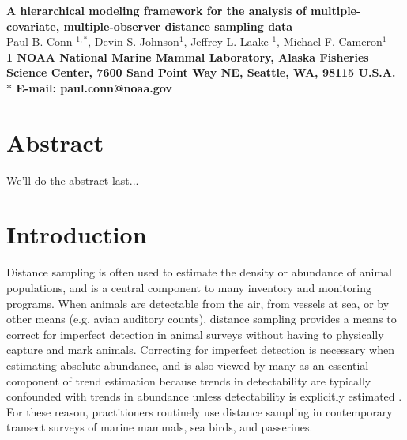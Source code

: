 \documentclass[10pt]{article}
\date{}
\begin{document}
\begin{flushleft}
{\Large
\textbf{A hierarchical modeling framework for the analysis of
multiple-covariate, multiple-observer distance sampling data} }
\\
Paul B. Conn $^{1,\ast}$,
Devin S. Johnson$^{1}$,
Jeffrey L. Laake $^{1}$,
Michael F. Cameron$^{1}$
\\
\bf{1} NOAA National Marine Mammal Laboratory, Alaska Fisheries Science Center,
7600 Sand Point Way NE, Seattle, WA, 98115 U.S.A.
\\
$\ast$ E-mail: paul.conn@noaa.gov
\end{flushleft}

\section*{Abstract}
We'll do the abstract last...


\section*{Introduction}

Distance sampling \cite{BucklandEtAl2001} is often used to estimate the density or abundance of animal populations, and is a central component to many inventory and monitoring programs.  When animals are detectable from the air, from vessels at sea, or by other means (e.g. avian auditory counts), distance sampling provides a means to correct for imperfect detection in animal surveys without having to physically capture and mark animals.  Correcting for imperfect detection is necessary when estimating absolute abundance, and is also viewed by many as an essential component of trend estimation because trends in detectability are typically confounded with trends in abundance unless detectability is explicitly estimated \cite{Buckland2006,NicholsEtAl2009}.  For these reason, practitioners routinely use distance sampling in contemporary transect surveys of marine mammals, sea birds, and passerines.
\end{document}
